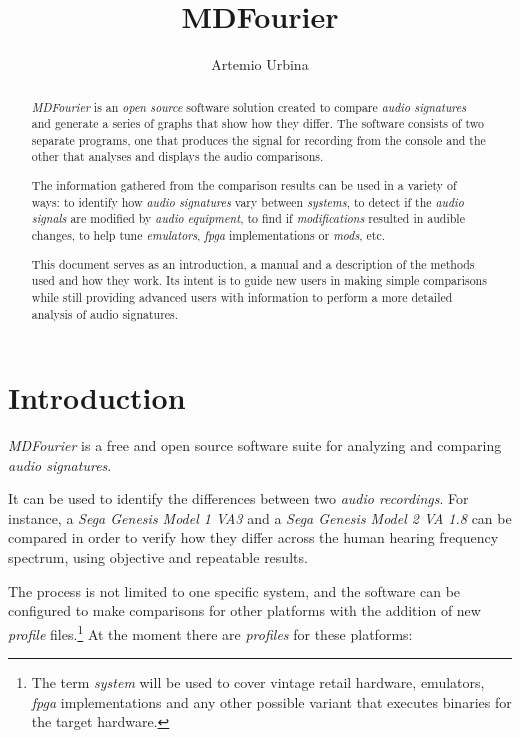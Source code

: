 \documentclass[10pt,a4paper]{report}
\title{MDFourier}
\author{Artemio Urbina}
\newcommand{\ac}[1]{\textit{\mbox{\acrshort{#1}}}}
\begin{document}
	
\begin{titlepage}
	\maketitle
	\thispagestyle{empty}
\end{titlepage}

\begin{abstract}
\textit{MDFourier} is an \textit{open source} software solution created to compare \textit{audio signatures} and generate a series of graphs that show how they differ. The software consists of two separate programs, one that produces the signal for recording from the console and the other that analyses and displays the audio comparisons. 

The information gathered from the comparison results can be used in a variety of ways: to identify how \textit{audio signatures} vary between \textit{systems}, to detect if the \textit{audio signals} are modified by \textit{audio equipment}, to find if \textit{modifications} resulted in audible changes, to help tune \textit{emulators}, \ac{fpga} implementations or \textit{mods}, etc.

This document serves as an introduction, a manual and a description of the methods used and how they work. Its intent is to guide new users in making simple comparisons while still providing advanced users with information to perform a more detailed analysis of audio signatures.
\end{abstract}

\tableofcontents

\chapter{Introduction}

\textit{MDFourier} is a free and open source software suite for analyzing and comparing \textit{audio signatures}.

It can be used to identify the differences between two \textit{audio recordings}. For instance, a \textit{Sega Genesis Model 1 VA3} and a \textit{Sega Genesis Model 2 VA 1.8} can be compared in order to verify how they differ across the human hearing frequency spectrum, using objective and repeatable results.

The process is not limited to one specific system, and the software can be configured to make comparisons for other platforms with the addition of new \textit{profile} files.\footnote{The term \textit{system} will be used to cover vintage retail hardware, emulators, \ac{fpga} implementations and any other possible variant that executes binaries for the target hardware.} At the moment there are \textit{profiles} for these platforms:
\end{document}
